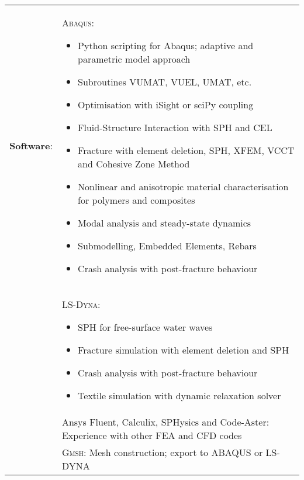 \documentclass[a4paper,10pt]{article} %
\begin{document}
\begin{tabular}{r p{13.5cm}}
\textbf{Software}: & \textsc{Abaqus}: \footnotesize{\begin{itemize}
		\item Python scripting for Abaqus; adaptive and parametric model approach
		\item Subroutines VUMAT, VUEL, UMAT, etc.
		\item Optimisation with iSight or sciPy coupling
		\item Fluid-Structure Interaction with SPH and CEL
		\item Fracture with element deletion, SPH, XFEM, VCCT and Cohesive Zone Method
		\item Nonlinear and anisotropic material characterisation for polymers and composites
		\item Modal analysis and steady-state dynamics
		\item Submodelling, Embedded Elements, Rebars
		\item Crash analysis with post-fracture behaviour
	\end{itemize}}\\
           & \textsc{LS-Dyna}: \footnotesize{\begin{itemize}
           		\item SPH for free-surface water waves
           		\item Fracture simulation with element deletion and SPH
           		\item Crash analysis with post-fracture behaviour
           		\item Textile simulation with dynamic relaxation solver
           \end{itemize}} \\%
           & Ansys Fluent, Calculix, SPHysics and Code-Aster: \footnotesize{Experience with other FEA and CFD codes} \vspace{0.2cm} \\ 
           & \textsc{Gmsh}: \footnotesize{Mesh construction; export to ABAQUS or LS-DYNA} \vspace{0.2cm} \\ 


\end{tabular}
\end{document}
